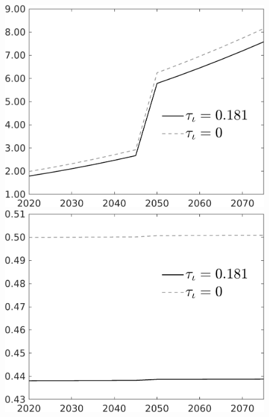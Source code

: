 \documentclass[12pt]{article}
\begin{document}
\begin{figure}[h!!]
\begin{minipage}[]{0.32\textwidth}
\includegraphics[width=1\textwidth]{../../codding_model/own_basedOnFried/optimalPol_010922_revision/figures/all_13Sept22/CompTauf_bytaul_Reg0_tauf_spillover0_nsk0_xgr0_knspil0_sep1_LFlimit1_emsbase0_countec0_GovRev0_etaa0.79_lgd1.png}
\end{minipage}	
\begin{minipage}[]{0.32\textwidth}
\includegraphics[width=1\textwidth]{../../codding_model/own_basedOnFried/optimalPol_010922_revision/figures/all_13Sept22/CompTauf_bytaul_Reg0_hh_spillover0_nsk0_xgr0_knspil0_sep1_LFlimit1_emsbase0_countec0_GovRev0_etaa0.79_lgd1.png}

\end{minipage}
\end{figure}
\end{document}
